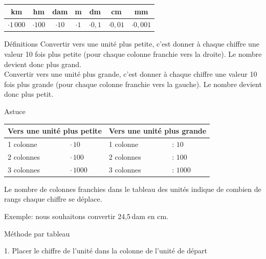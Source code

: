 \vspace{10pt}
{\footnotesize
\def\arraystretch{2}
\begin{tabularx}{\linewidth}{|*{7}{C|}}
\hline
km&hm&dam&m&dm&cm&mm\\\hline
$\cdot 1\,000$&$\cdot 100$&$\cdot 10$&$\cdot 1$&$\cdot 0,1$&$\cdot 0,01$&$\cdot 0,001$\\\hline
\end{tabularx}
\def\arraystretch{1}}

\vspace{20pt}
\begin{regle}{Définitions}
\textcolor{themeColor}{Convertir vers une unité plus petite}, c'est donner à chaque chiffre une valeur 10 fois plus petite (pour chaque colonne franchie vers la droite). Le nombre devient donc plus grand.\\[7pt]
\textcolor{themeColor}{Convertir vers une unité plus grande}, c'est donner à chaque chiffre une valeur 10 fois plus grande (pour chaque colonne franchie vers la gauche). Le nombre devient donc plus petit.
\end{regle}

\vspace{30pt}\begin{astuce}{Astuce}

\def\arraystretch{1.5}
\vspace{-5pt}\begin{tabularx}{\linewidth}{lX|lX}
\multicolumn{2}{l|}{Vers une unité plus \textbf{petite}}& \multicolumn{2}{l}{Vers une unité plus \textbf{grande}}\\\hline
1 colonne & $\cdot\, 10$ & 1 colonne & $:\, 10$ \\
2 colonnes & $\cdot\, 100$ & 2 colonnes & $:\, 100$ \\
3 colonnes & $\cdot\, 1000$ & 3 colonnes & $:\, 1000$ \\
\end{tabularx}
\def\arraystretch{1}

\vspace{10pt}
Le nombre de colonnes franchies dans le tableau des unités indique de combien de rangs chaque chiffre se déplace.
\end{astuce}

\newpage
Exemple: nous souhaitons convertir 24,5\,dam en cm.

\vspace{10pt}
\textcolor{themeColor}{Méthode par tableau}

1. Placer le chiffre de l'unité dans la colonne de l'unité de départ

